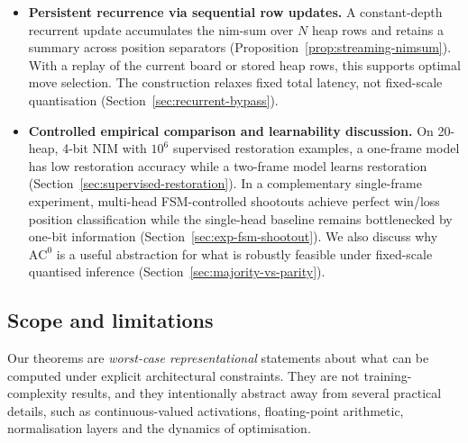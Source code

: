 \documentclass[twoside,11pt]{article}
\newcommand{\AC}{\mathrm{AC}}
\numberwithin{theorem}{section}
\numberwithin{equation}{section}
\begin{document}
\begin{itemize}[leftmargin=*]
\item \textbf{Persistent recurrence via sequential row updates.}
A constant-depth recurrent update accumulates the nim-sum over $N$ heap rows and retains a summary across position separators (Proposition~\ref{prop:streaming-nimsum}). With a replay of the current board or stored heap rows, this supports optimal move selection. The construction relaxes fixed total latency, not fixed-scale quantisation (Section~\ref{sec:recurrent-bypass}).

\item \textbf{Controlled empirical comparison and learnability discussion.}
On 20-heap, 4-bit NIM with $10^6$ supervised restoration examples, a one-frame model has low restoration accuracy while a two-frame model learns restoration (Section~\ref{sec:supervised-restoration}).
In a complementary single-frame experiment, multi-head FSM-controlled shootouts achieve perfect win/loss position classification while the single-head baseline remains bottlenecked by one-bit information (Section~\ref{sec:exp-fsm-shootout}).
We also discuss why $\AC^0$ is a useful abstraction for what is robustly feasible under fixed-scale quantised inference (Section~\ref{sec:majority-vs-parity}).
\end{itemize}

\subsection{Scope and limitations}
\label{sec:scope}

Our theorems are \emph{worst-case representational} statements about what can be computed under explicit architectural constraints.
They are not training-complexity results, and they intentionally abstract away from several practical details, such as continuous-valued activations, floating-point arithmetic, normalisation layers and the dynamics of optimisation.
\end{document}
